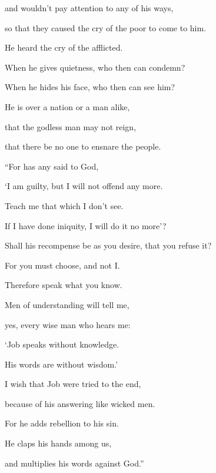 {\par }{\QB and wouldn’t pay attention to any of his ways,
\par }{\Q {}so that they caused the cry of the poor to come to him.
\par }{\QB He heard the cry of the afflicted.
\par }{\Q {}When he gives quietness, who then can condemn?
\par }{\QB When he hides his face, who then can see him?
\par }{\QB He is over a nation or a man alike,
\par }{\Q {}that the godless man may not reign,
\par }{\QB that there be no one to ensnare the people.
\par }{\BB \par }{\Q {}“For has any said to God,
\par }{\QB ‘I am guilty, but I will not offend any more.
\par }{\Q {}Teach me that which I don’t see.
\par }{\QB If I have done iniquity, I will do it no more’?
\par }{\Q {}Shall his recompense be as you desire, that you refuse it?
\par }{\QB For you must choose, and not I.
\par }{\QB Therefore speak what you know.
\par }{\Q {}Men of understanding will tell me,
\par }{\QB yes, every wise man who hears me:
\par }{\Q {}‘Job speaks without knowledge.
\par }{\QB His words are without wisdom.’
\par }{\Q {}I wish that Job were tried to the end,
\par }{\QB because of his answering like wicked men.
\par }{\Q {}For he adds rebellion to his sin.
\par }{\QB He claps his hands among us,
\par }{\QB and multiplies his words against God.”
\par }{\BB \par }
